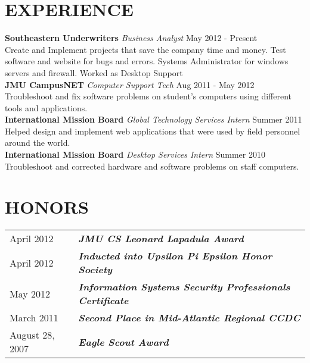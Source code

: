 \documentclass[line, margin]{res}
\begin{document}
\begin{resume}
\section{EXPERIENCE} 
\textbf{Southeastern Underwriters} \textit{Business Analyst} \hfill May 2012 - Present \\
Create and Implement projects that save the company time and money.  Test software and website for bugs and errors.  Systems Administrator for windows servers and firewall.  Worked as Desktop Support\\ [10pt]
\textbf{JMU CampusNET} \textit{Computer Support Tech} \hfill Aug 2011 - May 2012 \\
Troubleshoot and fix software problems on student's computers using different tools and applications.\\ [10pt]
\textbf{International Mission Board} \textit{Global Technology Services Intern} \hfill Summer 2011 \\
Helped design and implement web applications that were used by field personnel around the world.\\ [10pt]
\textbf{International Mission Board} \textit{Desktop Services Intern} \hfill Summer 2010 \\
Troubleshoot and corrected hardware and software problems on staff computers.\\

\section{HONORS}
\begin{tabular}{@{}l l}
April 2012 & \textbf{\textit{JMU CS Leonard Lapadula Award}} \\ [5pt]
April 2012 & \textbf{\textit{Inducted into Upsilon Pi Epsilon Honor Society}} \\ [5pt]
May 2012 & \textbf{\textit{Information Systems Security Professionals Certificate}} \\ [5pt]
March 2011 & \textbf{\textit{Second Place in Mid-Atlantic Regional CCDC}} \\ [5pt]
August 28, 2007 & \textbf{\textit{Eagle Scout Award}} \\
\end{tabular}


\end{resume}
\end{document}
